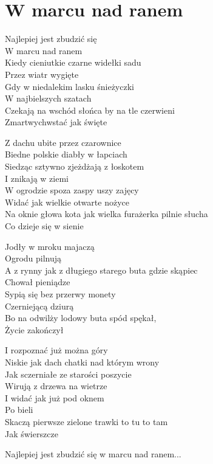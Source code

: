 \section{W marcu nad ranem}
\begin{text}
Najlepiej jest zbudzić się\\
W marcu nad ranem\\
Kiedy cieniutkie czarne widełki sadu\\
Przez wiatr wygięte\\
Gdy w niedalekim lasku śnieżyczki\\
W najbielszych szatach\\
Czekają na wschód słońca by na tle czerwieni\\
Zmartwychwstać jak święte

Z dachu ubite przez czarownice\\
Biedne polskie diabły w łapciach\\
Siedząc sztywno zjeżdżają z łoskotem\\
I znikają w ziemi\\
W ogrodzie spoza zaspy uszy zajęcy\\
Widać jak wielkie otwarte nożyce\\
Na oknie głowa kota jak wielka furażerka pilnie słucha\\
Co dzieje się w sienie

Jodły w mroku majaczą\\
Ogrodu pilnują\\
A z rynny jak z długiego starego buta gdzie skąpiec\\
Chował pieniądze\\
Sypią się bez przerwy monety\\
Czerniejącą dziurą\\
Bo na odwilży lodowy buta spód spękał,\\
Życie zakończył

I rozpoznać już można góry\\
Niskie jak dach chatki nad którym wrony\\
Jak sczerniałe ze starości poszycie\\
Wirują z drzewa na wietrze\\
I widać jak już pod oknem\\
Po bieli\\
Skaczą pierwsze zielone trawki to tu to tam\\
Jak świerszcze

Najlepiej jest zbudzić się w marcu nad ranem...
\end{text}
